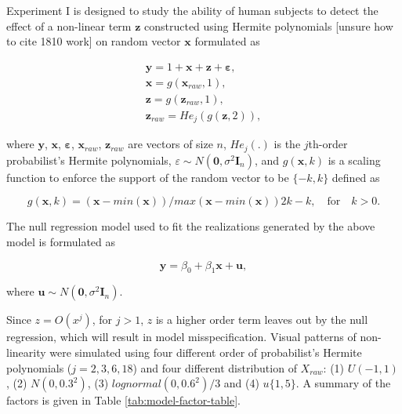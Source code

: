 \documentclass[]{interact}
\theoremstyle{plain}%
\theoremstyle{definition}
\theoremstyle{remark}
\begin{document}
Experiment I is designed to study the ability of human subjects to
detect the effect of a non-linear term \(\boldsymbol{z}\) constructed
using Hermite polynomials {[}unsure how to cite 1810 work{]} on random
vector \(\boldsymbol{x}\) formulated as

\begin{align} \label{eq:nonlinearity-model}
\boldsymbol{y} = 1 + \boldsymbol{x} + \boldsymbol{z} + \boldsymbol{\varepsilon},\\
\boldsymbol{x} = g(\boldsymbol{x}_{raw}, 1), \\
\boldsymbol{z} = g(\boldsymbol{z}_{raw}, 1), \\
\boldsymbol{z}_{raw} = He_j(g(\boldsymbol{z}, 2)),
\end{align}

\noindent where \(\boldsymbol{y}\), \(\boldsymbol{x}\),
\(\boldsymbol{\varepsilon}\), \(\boldsymbol{x}_{raw}\),
\(\boldsymbol{z}_{raw}\) are vectors of size \(n\), \(He_{j}(.)\) is the
\(j\)th-order probabilist's Hermite polynomials,
\(\varepsilon \sim N(\boldsymbol{0}, \sigma^2\boldsymbol{I}_n)\), and
\(g(\boldsymbol{x}, k)\) is a scaling function to enforce the support of
the random vector to be \(\{-k, k\}\) defined as

\begin{equation} \label{eq:scaling-function}
g(\boldsymbol{x}, k) = (\boldsymbol{x} - min(\boldsymbol{x}))/max(\boldsymbol{x} - min(\boldsymbol{x}))2k - k, \quad \text{for} \quad k > 0. 
\end{equation}

The null regression model used to fit the realizations generated by the
above model is formulated as

\begin{equation} \label{eq:null-model}
\boldsymbol{y} = \beta_0 + \beta_1 \boldsymbol{x} + \boldsymbol{u},
\end{equation}

\noindent where
\(\boldsymbol{u} \sim N(\boldsymbol{0}, \sigma^2\boldsymbol{I}_n)\).

Since \(z = O(x^j)\), for \(j > 1\), \(z\) is a higher order term leaves
out by the null regression, which will result in model misspecification.
Visual patterns of non-linearity were simulated using four different
order of probabilist's Hermite polynomials (\(j = 2, 3, 6, 18\)) and
four different distribution of \(X_{raw}\): (1) \(U(-1, 1)\), (2)
\(N(0, 0.3^2)\), (3) \(lognormal(0, 0.6^2)/3\) and (4) \(u\{1, 5\}\). A
summary of the factors is given in Table \ref{tab:model-factor-table}.
\end{document}
